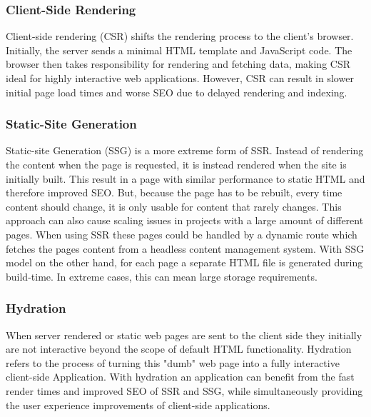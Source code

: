 \subsubsection{Client-Side Rendering}
Client-side rendering (CSR) shifts the rendering process to the client's browser. Initially, the server sends a minimal HTML template and JavaScript code. The browser then takes responsibility for rendering and fetching data, making CSR ideal for highly interactive web applications. However, CSR can result in slower initial page load times and worse SEO due to delayed rendering and indexing.

\subsubsection{Static-Site Generation}
Static-site Generation (SSG) is a more extreme form of SSR. Instead of rendering the content when the page is requested, it is instead rendered when the site is initially built. This result in a page with similar performance to static HTML and therefore improved SEO. But, because the page has to be rebuilt, every time content should change, it is only usable for content that rarely changes. This approach can also cause scaling issues in projects with a large amount of different pages. When using SSR these pages could be handled by a dynamic route which fetches the pages content from a headless content management system. With SSG model on the other hand, for each page a separate HTML file is generated during build-time. In extreme cases, this can mean large storage requirements. 

\subsubsection{Hydration}
When server rendered or static web pages are sent to the client side they initially are not interactive beyond the scope of default HTML functionality. Hydration refers to the process of turning this "dumb" web page into a fully interactive client-side Application. With hydration an application can benefit from the fast render times and improved SEO of SSR and SSG, while simultaneously providing the user experience improvements of client-side applications.

